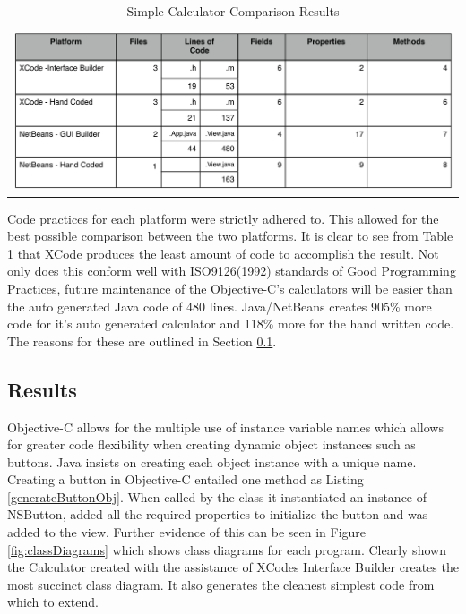 \documentclass[a4paper,14pt]{article}
\begin{document}
\begin{table}[H]
\centering
\begin{tabular}{l}
\includegraphics[scale=0.6]{FileComparisons.pdf}
\end{tabular}
\caption{Simple Calculator Comparison Results}
\label{table:calccompare}
\end{table}
Code practices for each platform were strictly adhered to. This allowed for the best possible comparison between the two platforms. It is clear to see from Table \ref{table:calccompare} that XCode produces the least amount of code to accomplish the result. Not only does this conform well with ISO9126(1992) standards of Good Programming Practices, future maintenance of the Objective-C's calculators will be easier than the auto generated Java code of 480 lines. Java/NetBeans creates 905\% more code for it's auto generated calculator and 118\% more for the hand written code. The reasons for these are outlined in Section \ref{sub:results}.

\subsection{Results} %
\label{sub:results}

Objective-C allows for the multiple use of instance variable names which allows for greater code flexibility when creating dynamic object instances such as buttons. Java insists on creating each object instance with a unique name. Creating a button in Objective-C entailed one method as Listing \ref{generateButtonObj}. When called by the class it instantiated an instance of NSButton, added all the required properties to initialize the button and was added to the view. Further evidence of this can be seen in Figure \ref{fig:classDiagrams} which shows class diagrams for each program. Clearly shown the Calculator created with the assistance of XCodes Interface Builder creates the most succinct class diagram. It also generates the cleanest simplest code from which to extend.
 
\end{document}
